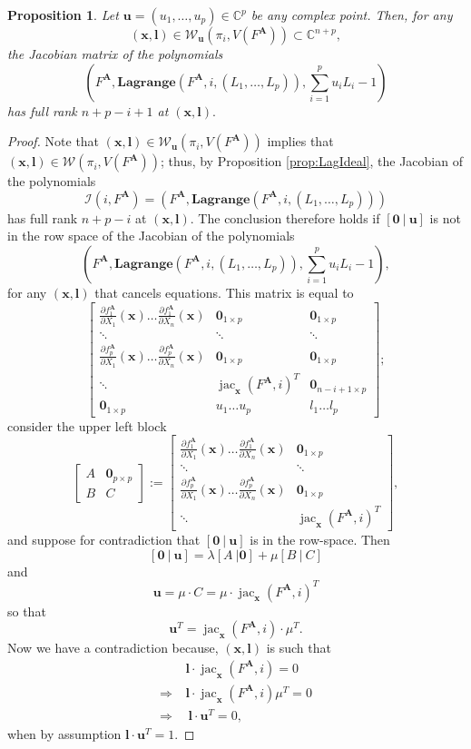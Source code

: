 \documentclass[12pt]{article}
\def\sI{\mathscr{I}}
\def\bz{{{\bm 0}}}
\def\mA{{\bm A}}
\def\ub{{\bm u}}
\def\lb{{\bm l}}
\def\xb{{\bm x}}
\DeclareMathOperator{\jac}{jac}
\def\pa{\partial}
\def\C{\mathbb{C}}
\def\lagFA{{\bm{Lagrange}}(F^{\mA},i,(L_1,\hdots,L_p))}
\def\udl{\sum_{i=1}^pu_iL_i}
\newtheorem{prop}[theorem]{Proposition}
\begin{document}
    \begin{prop}\label{prop:RadLagPolarV}
     Let $\ub = (u_1,\hdots,u_p) \in \C^p$ be any complex point. Then,
     for any \[(\xb,\lb)\in
     \mathscr{W}_{\ub}\left(\pi_i,V(F^{\mA})\right) \subset
     \C^{n+p},\] the Jacobian matrix of the polynomials
     \[
    \left( F^{\mA},\lagFA,\udl-1\right) 
    \]
 has full rank $n+p-i+1$ at $(\xb,\lb).$ 
    \end{prop}
    \begin{proof}
    Note that $(\xb,\lb)\in\mathscr{W}_{\ub}(\pi_i,V(F^{\mA}))$
    implies that $(\xb,\lb)\in\mathscr{W}(\pi_i,V(F^{\mA}))$; thus, by
    Proposition \ref{prop:LagIdeal}, the Jacobian of the
    polynomials \[\sI(i,F^{\mA}) = (F^{\mA},\lagFA)\] has full rank
    $n+p-i$ at $(\xb,\lb)$. The conclusion therefore holds if
    $[\bz~|~\ub]$ is not in the row space of the Jacobian of the
    polynomials
    \[
    \left(F^{\mA},\lagFA,\udl -1\right),
    \]
    for any $(\xb,\bm l)$ that cancels equations. This matrix is equal to
    \[
    \left[ 
    \begin{array}{c|c|c}
    \frac{\pa f_1^{\mA}}{\pa X_1}(\xb) \hdots \frac{\pa f_1^{\mA}}{\pa X_n}(\xb) & \bz_{1\times p} & \bz_{1\times p}\\
    \ddots & \ddots & \ddots\\
    \frac{\pa f_p^{\mA}}{\pa X_1}(\xb) \hdots \frac{\pa f_p^{\mA}}{\pa X_n}(\xb) & \bz_{1\times p} & \bz_{1\times p}\\
    \ddots &\jac_{\xb}(F^{\mA},i)^T & \bz_{n-i+1\times p}\\
    \bz_{1 \times p} & u_1 \hdots u_p & l_1 \hdots l_p 
    \end{array}
    \right];
    \]
    consider the upper left block
    \[
    \left[ 
    \begin{array}{c|c}
    A & \bz_{p\times p} \\
    B & C 
    \end{array}
    \right]
    :=
    \left[ 
    \begin{array}{c|c}
    \frac{\pa f_1^{\mA}}{\pa X_1}(\xb) \hdots \frac{\pa f_1^{\mA}}{\pa X_n}(\xb) & \bz_{1\times p} \\
    \ddots & \ddots \\
    \frac{\pa f_p^{\mA}}{\pa X_1}(\xb) \hdots \frac{\pa f_p^{\mA}}{\pa X_n}(\xb) & \bz_{1\times p} \\
    \ddots &\jac_{\xb}(F^{\mA},i)^T
    \end{array}
    \right],
    \]
    and suppose for contradiction that $[\bz~|~\ub]$ is in the row-space. Then 
    \[
    [\bz~|~\ub]
    =
    \lambda [A~|\bz] + \mu[B~|~C]
    \]
    and 
    \[
    \ub = \mu \cdot C = \mu \cdot \jac_{\xb} (F^{\mA},i)^T
    \]
    so that 
    \[
    \ub^T = \jac_{\xb} (F^{\mA},i) \cdot \mu^T.
    \]
    Now we have a contradiction because, $(\xb,\lb)$ is such that 
    \begin{align*}
        &\lb \cdot \jac_{\xb} (F^{\mA},i)=0\\
        \Rightarrow
        ~&\lb \cdot \jac_{\xb} (F^{\mA},i) \mu^T= 0\\
        \Rightarrow
        ~&~\lb \cdot \ub^T = 0,
    \end{align*}
    when by assumption $\lb \cdot \ub^T = 1.$ 
    \end{proof}
\end{document}
